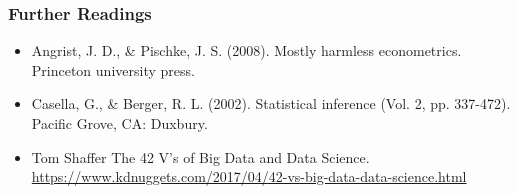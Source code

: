 \documentclass[
  shownotes,
  xcolor={svgnames},
  hyperref={colorlinks,citecolor=DarkBlue,linkcolor=DarkRed,urlcolor=DarkBlue}
  , aspectratio=169]{beamer}
\begin{document}

\begin{frame}
\frametitle{Further Readings}

\begin{itemize}
  \item Angrist, J. D., \& Pischke, J. S. (2008). Mostly harmless econometrics. Princeton university press.
  \bigskip
  \item Casella, G., \& Berger, R. L. (2002). Statistical inference (Vol. 2, pp. 337-472). Pacific Grove, CA: Duxbury.
  \bigskip 
  \item Tom Shaffer The 42 V’s of Big Data and Data Science. \url{https://www.kdnuggets.com/2017/04/42-vs-big-data-data-science.html}
\end{itemize}

\end{frame}

\end{document}

